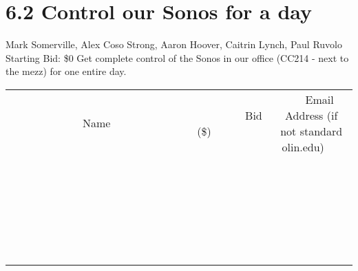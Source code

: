 \documentclass[11pt]{article}
\begin{document}
\section*{6.2 Control our Sonos for a day}
Mark Somerville, Alex Coso Strong, Aaron Hoover, Caitrin Lynch, Paul Ruvolo
\\
Starting Bid: \$0
\newline
Get complete control of the Sonos in our office (CC214 - next to the mezz) for one entire day.
\\[6ex]
\begin{tabular}{c c c}
~~~~~~~~~~~~~Name~~~~~~~~~~~~~ & ~~~~~~~~~Bid (\$)~~~~~~~~~  & ~~~Email Address (if not standard olin.edu)~~~\\
 & & \\
\hline
 & & \\
\hline
 & & \\
\hline
 & & \\
\hline
 & & \\
\hline
 & & \\
\hline
 & & \\
\hline
 & & \\
\hline
 & & \\
\hline
 & & \\
\hline
 & & \\
\hline
 & & \\
\hline
 & & \\
\hline
 & & \\
\hline
 & & \\
\hline
 & & \\
\hline
 & & \\
\hline
 & & \\
\hline
 & & \\
\hline
 & & \\
\hline
 & & \\
\hline
 & & \\
\hline
 & & \\
\hline
 & & \\
\hline
 & & \\
\hline
 & & \\
\hline
\end{tabular}
\newpage
\end{document}
